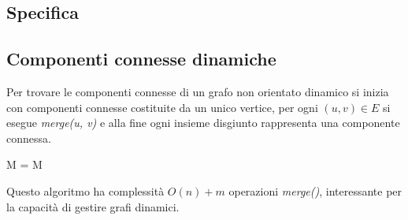 \subsection{Specifica}
 \begin{algorithm}[H]
\DontPrintSemicolon
{}




\caption{\protect\Mfset}
\Mfset {}\;
\Int {}\;
\end{algorithm}
\subsection{Componenti connesse dinamiche}
\begin{multicols}{2}
Per trovare le componenti connesse di un grafo non orientato dinamico si inizia con componenti connesse costituite da un unico vertice, per ogni $(u, v)\in E$ si esegue \emph{merge(u, v)} e alla fine ogni insieme
disgiunto rappresenta una componente connessa.
 \begin{algorithm}[H]
\DontPrintSemicolon
{}




\caption{\protect\Mfset \protect{}}
\Mfset M = \;
\Return M\;
\end{algorithm}
\end{multicols}
Questo algoritmo ha complessit\`a $O(n)+m$ operazioni \emph{merge()}, interessante per la capacit\`a di gestire grafi dinamici.
